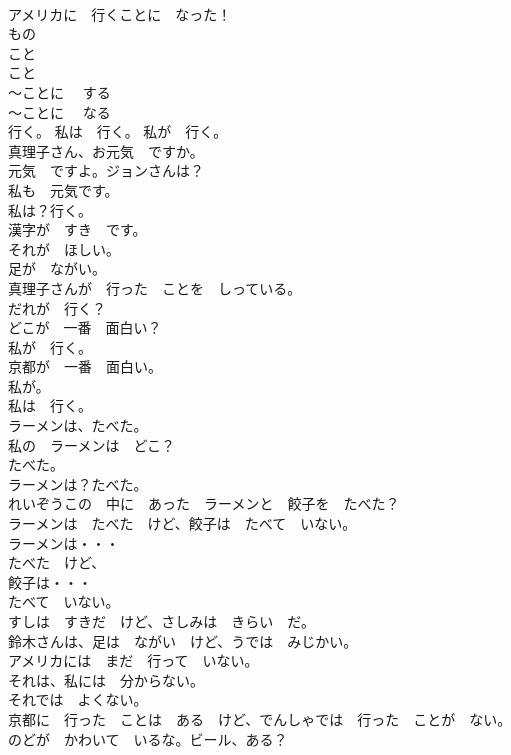 \documentclass[8pt]{extreport}
\begin{document}
\begin{CJK}{UTF8}{min}
\\	アメリカに　行くことに　なった！	
\\	もの	
\\	こと	
\\	こと	
\\	～ことに　 する	
\\	～ことに　 なる	
\\	行く。 私は　行く。 私が　行く。	
\\	真理子さん、お元気　ですか。	
\\	元気　ですよ。ジョンさんは？	
\\	私も　元気です。	
\\	私は？行く。	
\\	漢字が　すき　です。	
\\	それが　ほしい。	
\\	足が　ながい。	
\\	真理子さんが　行った　ことを　しっている。	
\\	だれが　行く？	
\\	どこが　一番　面白い？	
\\	私が　行く。	
\\	京都が　一番　面白い。	
\\	私が。	
\\	私は　行く。	
\\	ラーメンは、たべた。	
\\	私の　ラーメンは　どこ？	
\\	たべた。	
\\	ラーメンは？たべた。	
\\	れいぞうこの　中に　あった　ラーメンと　餃子を　たべた？	
\\	ラーメンは　たべた　けど、餃子は　たべて　いない。	
\\	ラーメンは・・・	
\\	たべた　けど、	
\\	餃子は・・・	
\\	たべて　いない。	
\\	すしは　すきだ　けど、さしみは　きらい　だ。	
\\	鈴木さんは、足は　ながい　けど、うでは　みじかい。	
\\	アメリカには　まだ　行って　いない。	
\\	それは、私には　分からない。	
\\	それでは　よくない。	
\\	京都に　行った　ことは　ある　けど、でんしゃでは　行った　ことが　ない。	
\\	のどが　かわいて　いるな。ビール、ある？	

\end{CJK}
\end{document}
